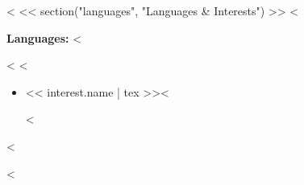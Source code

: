 <%
<< section("languages", "Languages & Interests") >>
<%
\begin{description}
  \item \textbf{Languages:} <%

\end{description}
<%
<%
\begin{itemize}
<%
  \item << interest.name | tex >><%

<%
\end{itemize}
<%

<%
